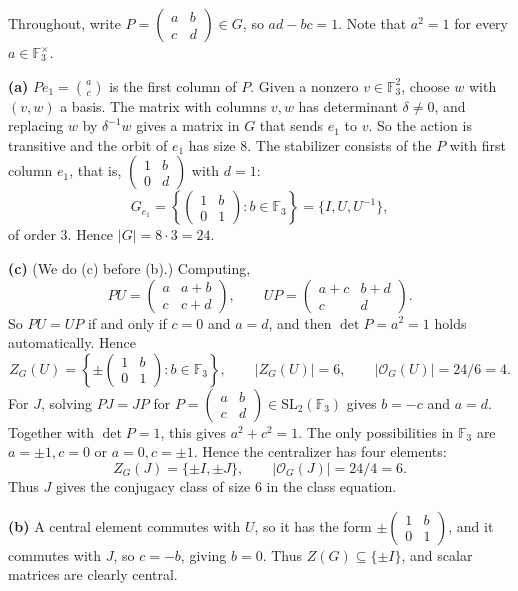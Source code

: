 \documentclass[11pt]{article}
\newcommand{\F}{\mathbb{F}}
\newcommand{\SL}{\mathrm{SL}}
\begin{document}
\begin{solution}
 Throughout, write $P=\begin{pmatrix}a&b\\c&d\end{pmatrix}\in G$, so
 $ad-bc=1$. Note that $a^2=1$ for every $a\in\F_3^\times$.

\textbf{(a)} $Pe_1=\binom ac$ is the first column of $P$. Given a nonzero
 $v\in\F_3^2$, choose $w$ with $(v,w)$ a basis. The matrix with columns $v,w$
 has determinant $\delta\neq0$, and replacing $w$ by $\delta^{-1}w$ gives a matrix
 in $G$ that sends $e_1$ to $v$. So the action is transitive and the orbit
 of $e_1$ has size $8$. The stabilizer consists of the $P$ with
 first column $e_1$, that is, $\begin{pmatrix}1&b\\0&d\end{pmatrix}$ with $d=1$:
\[
  G_{e_1}=\left\{\begin{pmatrix}1&b\\0&1\end{pmatrix}:b\in\F_3\right\}
  =\{I,U,U^{-1}\},
\]
 of order $3$. Hence $|G|=8\cdot3=24$.

\textbf{(c)} (We do (c) before (b).) Computing,
\[
  PU=\begin{pmatrix}a&a+b\\c&c+d\end{pmatrix},\qquad
  UP=\begin{pmatrix}a+c&b+d\\c&d\end{pmatrix}.
\]
 So $PU=UP$ if and only if $c=0$ and $a=d$, and then $\det P=a^2=1$ holds
 automatically. Hence
\[
  Z_G(U)=\left\{\pm\begin{pmatrix}1&b\\0&1\end{pmatrix}:b\in\F_3\right\},
  \qquad |Z_G(U)|=6,\qquad |\mathcal{O}_G(U)|=24/6=4.
\]
For $J$, solving $PJ=JP$ for
$P=\begin{pmatrix}a&b\\c&d\end{pmatrix}\in\SL_2(\F_3)$ gives
$b=-c$ and $a=d$. Together with $\det P=1$, this gives
$a^2+c^2=1$. The only possibilities in $\F_3$ are
$a=\pm1,c=0$ or $a=0,c=\pm1$. Hence the centralizer has four elements:
\[
  Z_G(J)=\{\pm I,\pm J\},\qquad |\mathcal{O}_G(J)|=24/4=6.
\]
Thus $J$ gives the conjugacy class of size $6$ in the class equation.

\textbf{(b)} A central element commutes with $U$, so it has the form
$\pm\begin{pmatrix}1&b\\0&1\end{pmatrix}$, and it commutes with $J$, so
$c=-b$, giving $b=0$. Thus $Z(G)\subseteq\{\pm I\}$, and scalar matrices are
 clearly central.


\end{solution}
\end{document}
